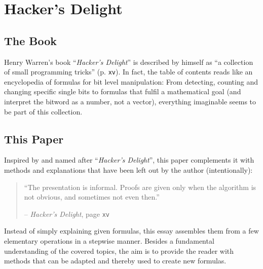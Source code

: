 \section{Hacker's Delight}\label{sec:book}


\subsection*{The Book}
Henry Warren's book ``\emph{Hacker's Delight}''
is described by himself as
``a collection of small programming tricks''
\cite{Warren:2012:HD:2462741} (p. \texttt{xv}).
In fact, the table of contents reads like
an encyclopedia of formulas for bit level manipulation:
From detecting, counting and changing specific single bits
to formulas that fulfil a mathematical goal
(and interpret the bitword as a number, not a vector),
everything imaginable seems to be part of this collection.


\subsection*{This Paper}
Inspired by and named after ``\emph{Hacker's Delight}'',
this paper complements it with methods and explanations
that have been left out by the author (intentionally):

\begin{quote}
``The presentation is informal.
Proofs are given only when the algorithm is not obvious,
and sometimes not even then.''
\par\hfill -- \emph{Hacker's Delight},
page \texttt{xv} \cite{Warren:2012:HD:2462741}
\end{quote}

Instead of simply explaining given formulas,
this essay assembles them from a few elementary operations
in a stepwise manner.
Besides a fundamental understanding of the covered topics,
the aim is to provide the reader with methods
that can be adapted and thereby used to create new formulas.
